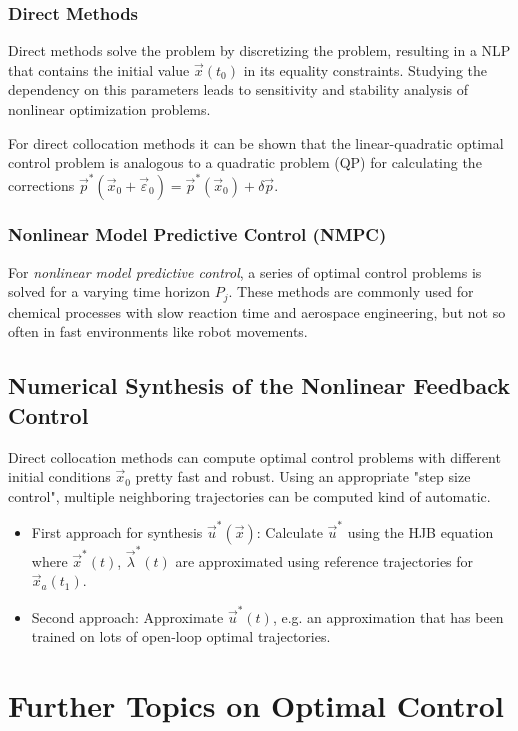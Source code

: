 		\subsection{Direct Methods}
			Direct methods solve the problem by discretizing the problem, resulting in a NLP that contains the initial value \( \vec{x}(t_0) \) in its equality constraints. Studying the dependency on this parameters leads to sensitivity and stability analysis of nonlinear optimization problems.

			For direct collocation methods it can be shown that the linear-quadratic optimal control problem is analogous to a quadratic problem (QP) for calculating the corrections \( \vec{p}^\ast(\vec{x}_0 + \vec{\varepsilon}_0) = \vec{p}^\ast(\vec{x}_0) + \delta\vec{p} \).

		\subsection{Nonlinear Model Predictive Control (NMPC)}
			For \emph{nonlinear model predictive control}, a series of optimal control problems is solved for a varying time horizon \(P_j\). These methods are commonly used for chemical processes with slow reaction time and aerospace engineering, but not so often in fast environments like robot movements.

	\section{Numerical Synthesis of the Nonlinear Feedback Control}
		Direct collocation methods can compute optimal control problems with different initial conditions \( \vec{x}_0 \) pretty fast and robust. Using an appropriate "step size control", multiple neighboring trajectories can be computed kind of automatic.
		\begin{itemize}
			\item First approach for synthesis \( \vec{u}^\ast(\vec{x}) \): Calculate \( \vec{u}^\ast \) using the HJB equation where \( \vec{x}^\ast(t) \), \( \vec{\lambda}^\ast(t) \) are approximated using reference trajectories for \( \vec{x}_a(t_1) \).
			\item Second approach: Approximate \( \vec{u}^\ast(t) \), e.g. an approximation that has been trained on lots of open-loop optimal trajectories.
		\end{itemize}

\chapter{Further Topics on Optimal Control}
